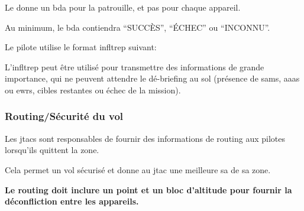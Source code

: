 \begin{e1}
\begin{e2}
			\item Le \ja{} donne un \gls{bda} pour la patrouille, et pas pour chaque appareil.
			
			\item Au minimum, le \gls{bda} contiendra ``SUCCÈS'', ``ÉCHEC'' ou ``INCONNU''.
			
		\end{e2}
		
	
	\begin{e2}
		
		\begin{minipage}{\linewidth}
			
			\item Le pilote utilise le format \gls{infltrep} suivant:
		\end{minipage}
		
		\item L'\gls{infltrep} peut être utilisé pour transmettre des informations de grande importance, qui ne peuvent attendre le dé-briefing au sol (présence de \glspl{sam}, \glspl{aaa} ou \glspl{ewr}, cibles restantes ou échec de la mission).
		
	\end{e2}
	
\end{e1}

\subsubsection{Routing/Sécurité du vol}%

Les \glspl{jtac} sont responsables de fournir des informations de routing aux pilotes lorsqu'ils quittent la zone.

Cela permet un vol sécurisé et donne au \gls{jtac} une meilleure \gls{sa} de sa zone.

\textbf{Le routing doit inclure un point et un bloc d'altitude pour fournir la déconfliction entre les appareils.}